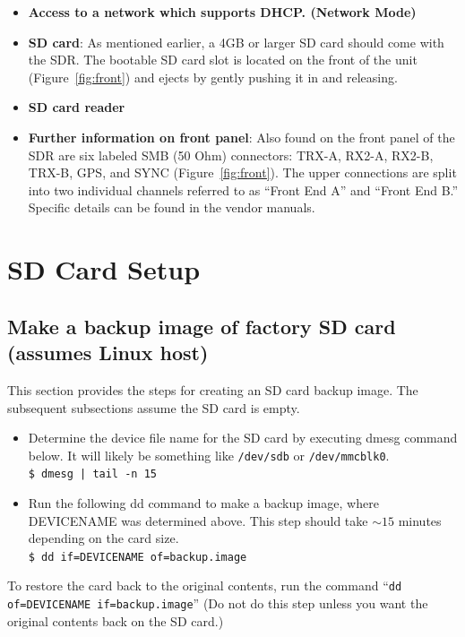 \begin{flushleft}
\begin{itemize}
\item \textbf{Access to a network which supports DHCP. (Network Mode)}

\item \textbf{SD card}:
As mentioned earlier, a 4GB or larger SD card should come with the SDR. The bootable SD card slot is located on the front of the unit (Figure~\ref{fig:front}) and ejects by gently pushing it in and releasing.

\item \textbf{SD card reader}

\item \textbf{Further information on front panel}:
Also found on the front panel of the SDR are six labeled SMB (50 Ohm) connectors: TRX-A, RX2-A, RX2-B, TRX-B, GPS, and SYNC (Figure~\ref{fig:front}). The upper connections are split into two individual channels referred to as ``Front End A'' and ``Front End B.'' Specific details can be found in the vendor manuals. \\   \bigskip

\end{itemize}
\end{flushleft}

\section{SD Card Setup}
\label{sec:SD_Card_Setup}
\subsection{Make a backup image of factory SD card (assumes Linux host)}
This section provides the steps for creating an SD card backup image. The subsequent subsections assume the SD card is empty.

\begin{itemize}
\item Determine the device file name for the SD card by executing dmesg command below. It will likely be something like \texttt{/dev/sdb} or \texttt{/dev/mmcblk0}.\\
\texttt{\$ dmesg | tail -n 15} \\
\item Run the following dd command to make a backup image, where DEVICENAME was determined above. This step should take $\sim15$ minutes depending on the card size.\\ \medskip
\texttt{\$ dd if=DEVICENAME of=backup.image}
\end{itemize}
\noindent To restore the card back to the original contents, run the command ``\texttt{dd of=DEVICENAME if=backup.image}'' (Do not do this step unless you want the original contents back on the SD card.)

